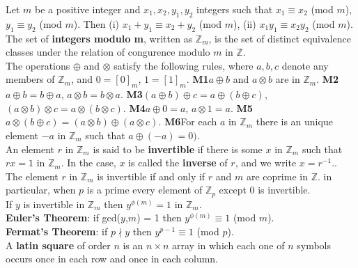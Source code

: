 \documentclass[10pt,landscape]{article}
\begin{document}
\begin{multicols}{4}
Let $m$ be a positive integer and $x_{1}, x_{2}, y_{1}, y_{2}$
integers such that $x_{1} \equiv x_{2}$ (mod $m$), $y_{1} \equiv y_{2}$
(mod $m$). Then (i) $x_{1} + y_{1} \equiv x_{2} + y_{2}$ (mod $m$), (ii)
$x_{1}y_{1} \equiv x_{2}y_{2}$ (mod $m$).\\

The set of \textbf{integers modulo m}, written as $\mathbb{Z}_{m}$, is
the set of distinct equivalence classes under the relation of
congurence modulo $m$ in $\mathbb{Z}$.\\

The operations $\oplus$ and $\otimes$ satisfy the following rules,
where $a,b,c$ denote any members of $\mathbb{Z}_{m}$, and $0
= [0]_{m}$, $1 = [1]_{m}$.
\textbf{M1}$a \oplus b$ and $a \otimes b$ are in $\mathbb{Z}_{m}$.
\textbf{M2}$a \oplus b = b \oplus a$, $a \otimes b = b \otimes a$.
\textbf{M3}$(a \oplus b) \oplus c = a \oplus (b \oplus c)$, $(a
\otimes b) \otimes c = a \otimes (b \otimes c)$.
\textbf{M4}$a \oplus 0 = a$, $a \otimes 1 = a$.
\textbf{M5}$a \otimes (b \oplus c) = (a \otimes b) \oplus (a \otimes c)$.
\textbf{M6}For each $a$ in $\mathbb{Z}_{m}$ there is  an unique
element $-a$ in $\mathbb{Z}_{m}$ such that $a \oplus(-a) = 0)$.\\

An element $r$ in $\mathbb{Z}_{m}$ is said to be \textbf{invertible}
if there is some $x$ in $\mathbb{Z}_{m}$ such that $rx = 1$ in
$\mathbb{Z}_{m}$. In the case, $x$ is called the \textbf{inverse} of
$r$, and we write $x = r^{-1}.$.\\

The element $r$ in $\mathbb{Z}_{m}$ is invertible if and only if $r$
and $m$ are coprime in $\mathbb{Z}$. in particular, when $p$ is a
prime every element of $\mathbb{Z}_{p}$ except 0 is invertible.\\

If $y$ is invertible in $\mathbb{Z}_{m}$ then $y^{\phi (m)} = 1$ in
$\mathbb{Z}_{m}$.\\

\textbf{Euler's Theorem}: if gcd($y$,$m$) = 1 then $y^{\phi (m)}
\equiv 1$ (mod $m$).\\

\textbf{Fermat's Theorem}: if $p \nmid y$ then $y^{p-1} \equiv 1$ (mod
$p$).\\

A \textbf{latin square} of order $n$ is an $n \times n$ array in which
each one of $n$ symbols occurs once in each row and once in each
column.\\


\end{multicols}
\end{document}
